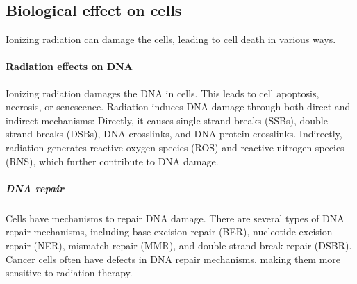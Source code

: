 
\subsection{Biological effect on cells}
Ionizing radiation can damage the cells, leading to cell death in various ways.

\paragraph{Radiation effects on DNA}
Ionizing radiation damages the DNA in cells.
This leads to cell apoptosis, necrosis, or senescence.
Radiation induces DNA damage through both direct and indirect mechanisms:
Directly, it causes single-strand breaks (SSBs), double-strand breaks (DSBs), DNA crosslinks, and DNA-protein crosslinks.
Indirectly, radiation generates reactive oxygen species (ROS) and reactive nitrogen species (RNS), which further contribute to DNA damage.

\subparagraph{DNA repair}
Cells have mechanisms to repair DNA damage.
There are several types of DNA repair mechanisms, including base excision repair (BER), nucleotide excision repair (NER), mismatch repair (MMR), and double-strand break repair (DSBR).
Cancer cells often have defects in DNA repair mechanisms, making them more sensitive to radiation therapy.



